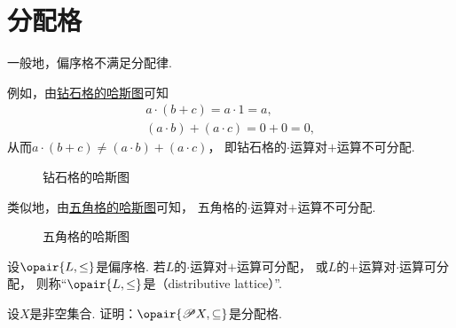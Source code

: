 \section{分配格}
一般地，偏序格不满足分配律.

例如，由\hyperref[figure:格论.偏序集2]{钻石格的哈斯图}可知\begin{gather*}
	a \cdot (b + c) = a \cdot 1 = a, \\
	(a \cdot b) + (a \cdot c) = 0 + 0 = 0,
\end{gather*}
从而\(a \cdot (b + c) \neq (a \cdot b) + (a \cdot c)\)，
即钻石格的\(\cdot\)运算对\(+\)运算不可分配.

\begin{figure}[hbt]
	\centering
	\caption{钻石格的哈斯图}
	\label{figure:格论.偏序集2}
\end{figure}

类似地，由\hyperref[figure:格论.偏序集3]{五角格的哈斯图}可知，
五角格的\(\cdot\)运算对\(+\)运算不可分配.

\begin{figure}[hbt]
	\centering
	\caption{五角格的哈斯图}
	\label{figure:格论.偏序集3}
\end{figure}

\begin{definition}
设\(\opair{L,\leq}\)是偏序格.
若\(L\)的\(\cdot\)运算对\(+\)运算可分配，
或\(L\)的\(+\)运算对\(\cdot\)运算可分配，
则称“\(\opair{L,\leq}\)是（distributive lattice）”.
\end{definition}

\begin{example}
设\(X\)是非空集合.
证明：\(\opair{\Powerset X,\subseteq}\)是分配格.
\end{example}

